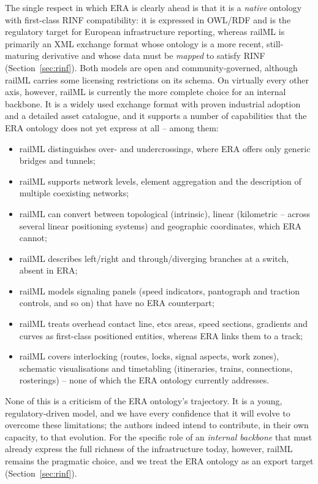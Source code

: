 \documentclass{ceurart}
\begin{document}
The single respect in which ERA is clearly ahead is that it is a \emph{native}
ontology with first-class RINF compatibility: it is expressed in OWL/RDF and is
the regulatory target for European infrastructure reporting, whereas railML is
primarily an XML exchange format whose ontology is a more recent, still-maturing
derivative and whose data must be \emph{mapped} to satisfy RINF
(Section~\ref{sec:rinf}). Both models are open and community-governed, although
railML carries some licensing restrictions on its schema. On virtually every
other axis, however, railML is currently the more complete choice for an internal
backbone. It is a widely used exchange format with proven industrial adoption and
a detailed asset catalogue, and it supports a number of capabilities that the ERA
ontology does not yet express at all -- among them:

\begin{itemize}
  \item railML distinguishes over- and undercrossings, where ERA offers only
        generic bridges and tunnels;
  \item railML supports network levels, element aggregation and the description
        of multiple coexisting networks;
  \item railML can convert between topological (intrinsic), linear (kilometric --
        across several linear positioning systems) and geographic coordinates,
        which ERA cannot;
  \item railML describes left/right and through/diverging branches at a switch,
        absent in ERA;
  \item railML models signaling panels (speed indicators, pantograph and
        traction controls, and so on) that have no ERA counterpart;
  \item railML treats overhead contact line, etcs areas, speed sections, gradients 
        and curves as first-class positioned entities, whereas ERA links them to a track;
  \item railML covers interlocking (routes, locks, signal aspects, work zones),
        schematic visualisations and timetabling (itineraries, trains,
        connections, rosterings) -- none of which the ERA ontology currently
        addresses.
\end{itemize}

None of this is a criticism of the ERA ontology's trajectory. It is a young,
regulatory-driven model, and we have every confidence that it will evolve to
overcome these limitations; the authors indeed intend to contribute, in their own
capacity, to that evolution. For the specific role of an \emph{internal backbone}
that must already express the full richness of the infrastructure today, however,
railML remains the pragmatic choice, and we treat the ERA ontology as an export
target (Section~\ref{sec:rinf}).
\end{document}
